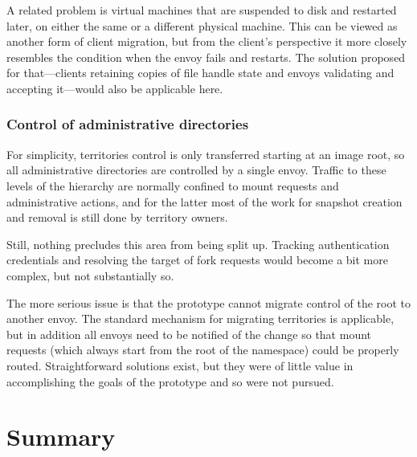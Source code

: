 A related problem is virtual machines that are suspended to disk and restarted later, on either the same or a different physical machine. This can be viewed as another form of client migration, but from the client's perspective it more closely resembles the condition when the envoy fails and restarts. The solution proposed for that---clients retaining copies of file handle state and envoys validating and accepting it---would also be applicable here.

\subsubsection{Control of administrative directories}

For simplicity, territories control is only transferred starting at an image root, so all administrative directories are controlled by a single envoy. Traffic to these levels of the hierarchy are normally confined to mount requests and administrative actions, and for the latter most of the work for snapshot creation and removal is still done by territory owners.

Still, nothing precludes this area from being split up. Tracking authentication credentials and resolving the target of fork requests would become a bit more complex, but not substantially so.

The more serious issue is that the prototype cannot migrate control of the root to another envoy. The standard mechanism for migrating territories is applicable, but in addition all envoys need to be notified of the change so that mount requests (which always start from the root of the namespace) could be properly routed. Straightforward solutions exist, but they were of little value in accomplishing the goals of the prototype and so were not pursued.

\section{Summary}
